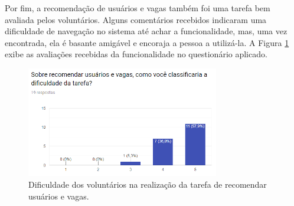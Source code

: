 Por fim, a recomendação de usuários e vagas também foi uma tarefa bem avaliada pelos voluntários. Alguns comentários recebidos indicaram uma dificuldade de navegação no sistema até achar a funcionalidade, mas, uma vez encontrada, ela é basante amigável e encoraja a pessoa a utilizá-la. A Figura \ref{avalGrafTURecomendar} exibe as avaliações recebidas da funcionalidade no questionário aplicado.

\begin{figure}[H]
    \caption{Dificuldade dos voluntários na realização da tarefa de recomendar usuários e vagas.}
       	\begin{center}
            \includegraphics[width=0.75\textwidth]{figuras/avaliacao/pdv-6.png}
        \end{center}
    \label{avalGrafTURecomendar}
\end{figure}